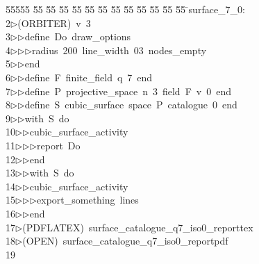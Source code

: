 %
%
\begin{tabbing}
55555 \= 55 \= 55 \= 55 \= 55 \= 55 \= 55 \= 55 \= 55 \= 55 \= 55 \= 55 \= 55 \= \>surface\_7\_0:\\[0pt]
2\>$\triangleright$\>(ORBITER)\ v\ 3\ \\[0pt]
3\>$\triangleright$\>$\triangleright$\>define\ Do\ draw\_options\ \\[0pt]
4\>$\triangleright$\>$\triangleright$\>$\triangleright$\>radius\ 200\ line\_width\ 03\ nodes\_empty\ \\[0pt]
5\>$\triangleright$\>$\triangleright$\>end\ \\[0pt]
6\>$\triangleright$\>$\triangleright$\>define\ F\ finite\_field\ q\ 7\ end\ \\[0pt]
7\>$\triangleright$\>$\triangleright$\>define\ P\ projective\_space\ n\ 3\ field\ F\ v\ 0\ end\ \\[0pt]
8\>$\triangleright$\>$\triangleright$\>define\ S\ cubic\_surface\ space\ P\ catalogue\ 0\ end\ \\[0pt]
9\>$\triangleright$\>$\triangleright$\>with\ S\ do\ \\[0pt]
10\>$\triangleright$\>$\triangleright$\>cubic\_surface\_activity\ \\[0pt]
11\>$\triangleright$\>$\triangleright$\>$\triangleright$\>report\ Do\ \\[0pt]
12\>$\triangleright$\>$\triangleright$\>end\ \\[0pt]
13\>$\triangleright$\>$\triangleright$\>with\ S\ do\ \\[0pt]
14\>$\triangleright$\>$\triangleright$\>cubic\_surface\_activity\ \\[0pt]
15\>$\triangleright$\>$\triangleright$\>$\triangleright$\>export\_something\ lines\ \\[0pt]
16\>$\triangleright$\>$\triangleright$\>end\\[0pt]
17\>$\triangleright$\>(PDFLATEX)\ surface\_catalogue\_q7\_iso0\_reporttex\\[0pt]
18\>$\triangleright$\>(OPEN)\ surface\_catalogue\_q7\_iso0\_reportpdf\\[0pt]
19\>\end{tabbing}
